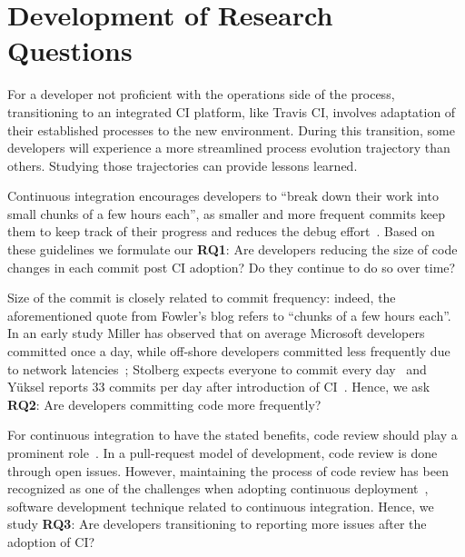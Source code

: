 
\section{Development of Research Questions}
\label{sec:background}

For a developer not proficient with the operations side of the process, transitioning to an integrated CI platform, like Travis CI, involves adaptation of their established processes to the new environment. During this transition, some developers will experience a more streamlined process evolution trajectory than others. Studying those trajectories can provide lessons learned.


%

Continuous integration encourages developers to ``break down their work into small chunks of a few hours each'', 
as smaller and more frequent commits keep them to keep track of their progress and reduces the debug 
effort~\cite{Fowler,Duvall}. %
Based on these guidelines we formulate our \textbf{RQ1}: Are developers reducing the size of code changes in 
each commit post CI adoption? Do they continue to do so over time?

Size of the commit is closely related to commit frequency: indeed, the aforementioned quote from Fowler's blog refers to ``chunks of a few hours each''. 
In an early study Miller has observed that on average Microsoft developers committed once a day, while off-shore
 developers committed less frequently due to network latencies~\cite{Miller}; Stolberg expects everyone to 
 commit every day~\cite{Stolberg} and Y\"{u}ksel reports 33 commits per day after introduction of CI~\cite{Yuksel}. 
Hence, we ask \textbf{RQ2}: Are developers committing code more frequently?

For continuous integration to have the stated benefits, code review should play a prominent role~\cite{Miller}. 
In a pull-request model of development, code review is done through open issues.
However, maintaining the process of code review has been recognized as one of the challenges when 
adopting continuous deployment~\cite{ClapsBSA}, software development technique related to continuous integration.
Hence, we study \textbf{RQ3}: Are developers transitioning to reporting more issues after the adoption of CI?

